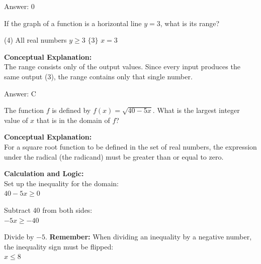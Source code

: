 \documentclass[11pt,paper=a4,answers]{exam}
\begin{document}
\begin{questions}
\begin{solution}
\vspace{30pt}

Answer: \colorbox{yellow!100}{0}
\end{solution}

\vspace{40pt}

\question
If the graph of a function is a horizontal line $y = 3$, what is its range?
\begin{tasks}(4)
    \task All real numbers
    \task $y \geq 3$
    \task $\{3\}$
    \task $x = 3$
\end{tasks}

\begin{solution}
\textbf{Conceptual Explanation:} \\
The range consists only of the output values. Since every input produces the same output (3), the range contains only that single number.

\vspace{30pt}

Answer: \colorbox{yellow!100}{C}
\end{solution}


\question
The function $f$ is defined by $f(x) = \sqrt{40 - 5x}$. What is the largest integer value of $x$ that is in the domain of $f$?

\begin{solution}
\textbf{Conceptual Explanation:} \\
For a square root function to be defined in the set of real numbers, the expression under the radical (the radicand) must be greater than or equal to zero. 

\vspace{30pt}

\textbf{Calculation and Logic:} \\
Set up the inequality for the domain: \\
$40 - 5x \geq 0$

\vspace{15pt}

Subtract 40 from both sides: \\
$-5x \geq -40$

\vspace{15pt}

Divide by $-5$. \textbf{Remember:} When dividing an inequality by a negative number, the inequality sign must be flipped: \\
$x \leq 8$


\end{solution}
\end{questions}
\end{document}
